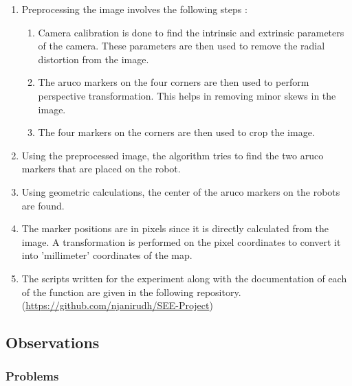\documentclass[10pt,a4paper]{article}
\begin{document}
\begin{enumerate}
		\item
		Preprocessing the image involves the following steps :
		\vspace{0.2cm}
		\begin{enumerate}
			\item
			Camera calibration is done to find the intrinsic and extrinsic parameters of the camera.	These parameters are then used to remove the radial distortion from the image.
			\item
			The aruco markers on the four corners are then used to perform perspective transformation. This helps in removing minor skews in the image.
			\item
			The four markers on the corners are then used to crop the image.			
		\end{enumerate}
		\vspace{0.3cm}
		\item
		Using the preprocessed image, the algorithm tries to find the two aruco markers that are placed on the robot.
		\item
		Using geometric calculations, the center of the aruco markers on the robots are found. 
		\item
		The marker positions are in pixels since it is directly calculated from the image. A transformation is performed on the pixel coordinates to convert it into 'millimeter' coordinates of the map.
		\item
		The scripts written for the experiment along with the documentation of each of the function are given in the following repository. (\href{https://github.com/njanirudh/SEE-Project}{https://github.com/njanirudh/SEE-Project})
\end{enumerate}




\subsection{Observations}

\subsubsection{Problems}
\end{document}
